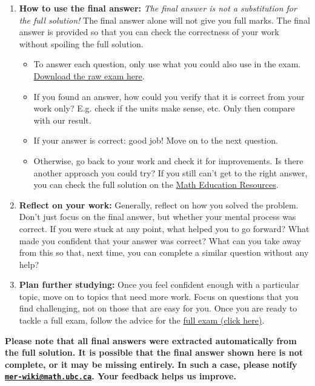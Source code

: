 \begin{enumerate}
\item {\bf How to use the final answer:} \emph{The final answer is not a substitution for the full solution!} The final answer alone will not give you full marks. The final answer is provided so that you can check the correctness of your work without spoiling the full solution.
\begin{itemize}
\item To answer each question, only use what you could also use in the exam. \href{\examURL}{Download the raw exam here}.
\item If you found an answer, how could you verify that it is correct from your work only? E.g. check if the units make sense, etc.  Only then compare with our result.
\item If your answer is correct: good job! Move on to the next question.
\item Otherwise, go back to your work and check it for improvements. Is there another approach you could try? If you still can't get to the right answer, you can check the full solution on the \href{http://www.math-education-resources.com}{Math Education Resources}.
\end{itemize}

\item {\bf Reflect on your work:} Generally, reflect on how you solved the problem. Don't just focus on the final answer, but whether your mental process was correct. If you were stuck at any point, what helped you to go forward? What made you confident that your answer was correct? What can you take away from this so that, next time, you can complete a similar question without any help?

\item {\bf Plan further studying:} Once you feel confident enough with a particular topic, move on to topics that need more work. Focus on questions that you find challenging, not on those that are easy for you. Once you are ready to tackle a full exam, follow the advice for the \href{http://matheducationresources.github.io/pdf_version/}{full exam (click here)}.
\end{enumerate}

{\bf Please note that all final answers were extracted automatically from the full solution. It is possible that the final answer shown here is not complete, or it may be missing entirely. In such a case, please notify \href{mailto:mer-wiki@math.ubc.ca}{\nolinkurl{mer-wiki@math.ubc.ca}}. Your feedback helps us improve.}

